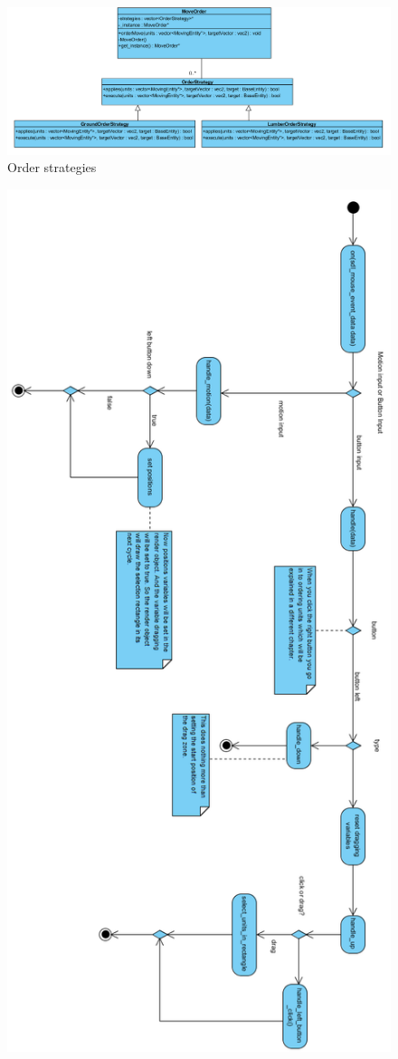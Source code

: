 \begin{figure}
    \centering
    \includegraphics[angle=-90,origin=c,scale=0.65]
    {res/order-strategies.png}
    \caption{Order strategies}\label{fig:orderstrategies}
\end{figure}

\begin{figure}
    \centering
    \includegraphics[scale=0.7]{res/ActivityDiagramMouseHandler180.png}

\end{figure}

